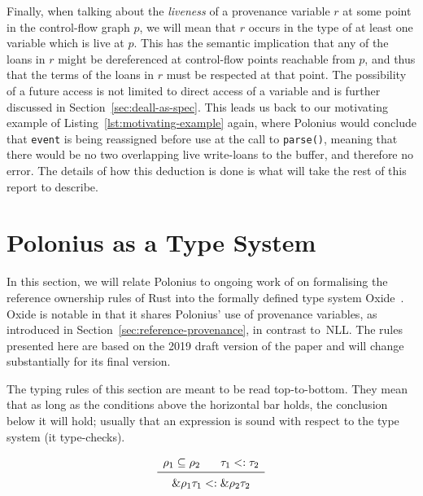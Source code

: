 \documentclass[11pt,a4paper,twoside,openany,draft]{report}
\newcommand{\InRust}[1]{\texttt{#1}}
\newcommand{\ntyperule}[2]{\begin{array}{c}#1\\\midrule\raisebox{1pt}{\strut}#2\end{array}}
\begin{document}
Finally, when talking about the \emph{liveness} of a provenance variable $r$ at
some point in the control-flow graph $p$, we will mean that $r$ occurs in the
type of at least one variable which is live at $p$. This has the semantic
implication that any of the loans in $r$ might be dereferenced at control-flow
points reachable from $p$, and thus that the terms of the loans in $r$ must be
respected at that point. The possibility of a future access is not limited to
direct access of a variable and is further discussed in
Section~\ref{sec:deall-as-spec}. This leads us back to our motivating example of
Listing~\ref{lst:motivating-example} again, where Polonius would conclude that
\InRust{event} is being reassigned before use at the call to \InRust{parse()},
meaning that there would be no two overlapping live write-loans to the buffer,
and therefore no error. The details of how this deduction is done is what will
take the rest of this report to describe.


\section{Polonius as a Type System}\label{sec:type-system}

In this section, we will relate Polonius to \citeauthor*{weiss_oxide:_2019}
ongoing work of \citeauthor*{weiss_oxide:_2019} on formalising the reference
ownership rules of Rust into the formally defined type system
Oxide~\cite{weiss_oxide:_2019}. Oxide is notable in that it shares Polonius' use
of provenance variables, as introduced in
Section~\ref{sec:reference-provenance}, in contrast to~NLL\@. The rules presented
here are based on the 2019 draft version of the paper and will change
substantially for its final version.

The typing rules of this section are meant to be read top-to-bottom. They mean
that as long as the conditions above the horizontal bar holds, the conclusion
below it will hold; usually that an expression is sound with respect to the type
system (it type-checks).

\begin{equation}\label{eq:s-ref-baby}
  \ntyperule{
    \rho_1 \subseteq \rho_2 \:\:\:\:\:\:\:\:
    \tau_1 <: \tau_2
  }%
  {
    \&\rho_1 \tau_1 <: \&\rho_2 \tau_2
  }
\end{equation}
\end{document}
